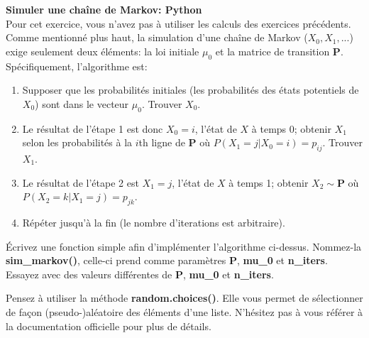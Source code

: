 \begin{Exercice}[20 minutes]\textbf{Simuler une chaîne de Markov: Python}\\
Pour cet exercice, vous n'avez pas à utiliser les calculs des exercices précédents.\\

Comme mentionné plus haut, la simulation d'une chaîne de Markov ($X_0, X_1, ...$) exige seulement deux éléments: la loi initiale $\mu_0$ et la matrice de transition $\mathbf{P}$. Spécifiquement, l'algorithme est:

\begin{enumerate}
    \item Supposer que les probabilités initiales (les probabilités des états potentiels de $X_0$) sont dans le vecteur $\mu_0$. Trouver $X_0$.
    \item Le résultat de l'étape 1 est donc $X_0 = i$, l'état de $X$ à temps 0; obtenir $X_1$ selon les probabilités à la $i$th ligne de $\mathbf{P}$ où $P(X_1=j|X_0=i)=p_{ij}$. Trouver $X_1$.
    \item Le résultat de l'étape 2 est $X_1 = j$, l'état de $X$ à temps 1; obtenir $X_2 \sim \mathbf{P}$ où $P(X_2=k|X_1=j)=p_{jk}$.
    \item Répéter jusqu'à la fin (le nombre d'iterations est arbitraire).
\end{enumerate}

Écrivez une fonction simple afin d'implémenter l'algorithme ci-dessus. Nommez-la \textbf{sim\_markov()}, celle-ci prend comme paramètres \textbf{P}, \textbf{mu\_0} et \textbf{n\_iters}. Essayez avec des valeurs différentes de \textbf{P}, \textbf{mu\_0} et \textbf{n\_iters}.



\begin{conseil}
    Pensez à utiliser la méthode \textbf{random.choices()}. Elle vous permet de sélectionner de façon (pseudo-)aléatoire des éléments d'une liste. N'hésitez pas à vous référer à la documentation officielle pour plus de détails.
\end{conseil}
\begin{solution}

\end{solution}
\end{Exercice}

